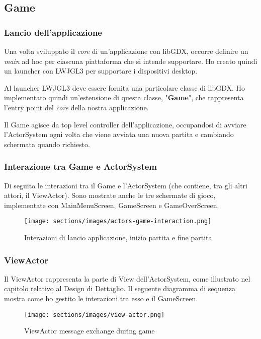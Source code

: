 \subsection{Game}

\subsubsection{Lancio dell'applicazione}
Una volta sviluppato il \textit{core} di un'applicazione con libGDX, occorre definire un \textit{main} ad hoc per ciascuna piattaforma che si intende supportare. Ho creato quindi un launcher con LWJGL3 per supportare i dispositivi desktop.

Al launcher LWJGL3 deve essere fornita una particolare classe di libGDX. Ho implementato quindi un'estensione di questa classe, "\textbf{Game}", che rappresenta l'entry point del \textit{core} della nostra applicazione. 

Il Game agisce da top level controller dell'applicazione, occupandosi di avviare l'ActorSystem ogni volta che viene avviata una nuova partita e cambiando schermata quando richiesto.

\subsubsection{Interazione tra Game e ActorSystem}
Di seguito le interazioni tra il Game e l'ActorSystem (che contiene, tra gli altri attori, il ViewActor).
Sono mostrate anche le tre schermate di gioco, implementate con MainMenuScreen, GameScreen e GameOverScreen.


\begin{figure}[H]
    \centering
    \caption{Interazioni di lancio applicazione, inizio partita e fine partita}
    \texttt{[image: sections/images/actors-game-interaction.png]}
    \label{ScreenBehavior}
\end{figure}


\subsubsection{ViewActor}
Il ViewActor rappresenta la parte di View dell'ActorSystem, come illustrato nel capitolo relativo al Design di Dettaglio. Il seguente diagramma di sequenza mostra come ho gestito le interazioni tra esso e il GameScreen.

\begin{figure}[H]
    \centering
    \caption{ViewActor message exchange during game}
    \texttt{[image: sections/images/view-actor.png]}
    \label{ScreenBehavior}
\end{figure}

